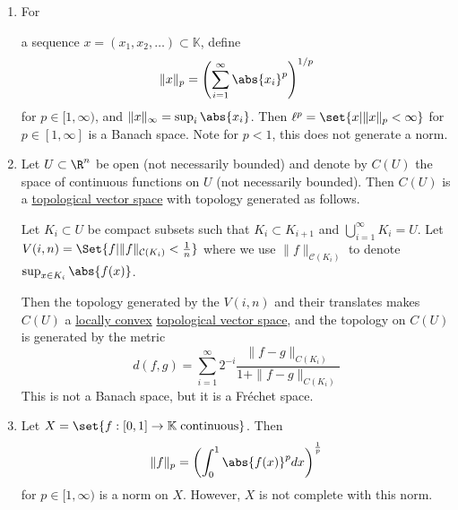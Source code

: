 \documentclass{article}
\newcommand{\K}{\mathbb{K}}
\begin{document}
\begin{eg}
\begin{enumerate}[label=(\roman*)]
            \begin{equation*}
                \|f\|_{C^k(\bar{U})} = \max_{\abs{\alpha} \leq k} \|D^\alpha f\|_\infty
            \end{equation*}
            Then $C^k(\bar{U})$ is a Banach space.
        \item \hypertarget{def:lpspace}{For} a sequence $x = (x_1, x_2, \dotsc) \subset \K$, define
            \begin{equation*}
                \|x\|_p = \left(\sum_{i=1}^\infty \abs{x_i}^p\right)^{1/p}
            \end{equation*}
            for $p \in [1, \infty)$, and $\|x\|_\infty = \sup_i \abs{x_i}$.  Then $\ell^p = \set{x | \|x\|_p < \infty}$ for $p \in [1, \infty]$ is a Banach space.  Note for $p<1$, this does not generate a norm.
        \item Let $U \subset \R^n$ be open (not necessarily bounded) and denote by $C(U)$ the space of continuous functions on $U$ (not necessarily bounded).
            Then $C(U)$ is a \hyperlink{def:tVS}{topological vector space} with topology generated as follows.

            Let $K_i \subset U$ be compact subsets such that $K_i \subset K_{i+1}$ and $\bigcup_{i=1}^\infty K_i = U$.
            Let $V(i, n) = \Set{f | \|f\|_{\mathcal{C}(K_i)} < \frac1n}$ where we use $\|f\|_{\mathcal{C}(K_i)}$ to denote $\sup_{x \in K_i} \abs{f(x)}$.

            Then the topology generated by the $V(i, n)$ and their translates makes $C(U)$ a \hyperlink{def:locallyConvex}{locally convex} \hyperlink{def:tVS}{topological vector space}, and the topology on $C(U)$ is generated by the metric
            \begin{equation*}
                d(f, g) = \sum_{i=1}^\infty 2^{-i} \frac{\|f-g\|_{C(K_i)}}{1 + \|f-g\|_{C(K_i)}}
            \end{equation*}
            This is not a Banach space, but it is a Fr\'echet space.

        \item Let $X = \set{f : [0, 1] \to \K \; \text{continuous}}$. Then
            \begin{equation*}
                \|f\|_p = \left(\int_0^1 \abs{f(x)}^p dx\right)^\frac1p
            \end{equation*}
            for $p \in [1, \infty)$ is a norm on $X$. However, $X$ is not complete with this norm.
    \end{enumerate}
\end{eg}
\end{document}
